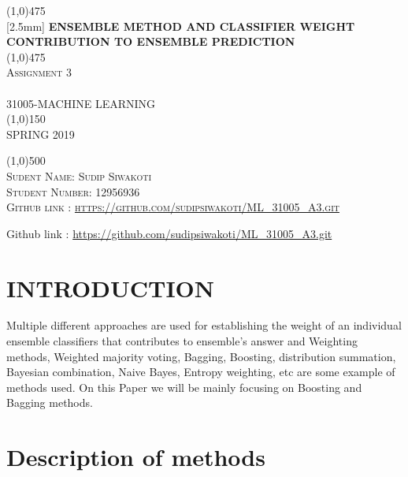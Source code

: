 \documentclass{article}
\begin{document}
\begin{titlepage}
	\begin{center}
    \line(1,0){475}\\
   [2.5mm]
    \huge{\bfseries ENSEMBLE METHOD  AND CLASSIFIER WEIGHT CONTRIBUTION TO ENSEMBLE PREDICTION}\\
    \line(1,0){475}\\
    [3mm]
    \textsc{\Large Assignment 3}\\
    [6cm]
    \textsc{\small \\
    [1mm]
    31005-MACHINE LEARNING\\
    \line(1,0){150}\\
    SPRING 2019}\\
    [5.cm]
    \end{center}
    \begin{flushleft}
    \line(1,0){500}\\
    \textsc{\large Sudent Name: Sudip Siwakoti \\Student Number: 12956936\\ Github link : \url {https://github.com/sudipsiwakoti/ML_31005_A3.git} }
    \end{flushleft}
    \begin{flushleft}
    Github link : \url {https://github.com/sudipsiwakoti/ML\_31005\_A3.git} 
    \end{flushleft}
    \lipsum[0]
\end{titlepage}
\tableofcontents
\thispagestyle{empty}
\cleardoublepage
\setcounter{page}{1}

\section{INTRODUCTION}\label{sec:intor}


Multiple different approaches are used for establishing the weight of an individual ensemble classifiers that contributes to ensemble’s answer and Weighting methods, Weighted majority voting, Bagging, Boosting, distribution summation, Bayesian combination, Naive Bayes, Entropy weighting, etc are some example of methods used. On this Paper we will be mainly focusing on Boosting and Bagging methods.
\section{Description of methods}
\end{document}
